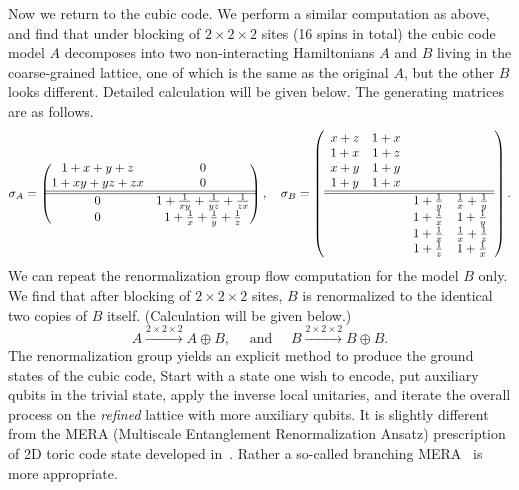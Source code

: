 Now we return to the cubic code. We perform a similar computation as above,
and find that under blocking of $2 \times 2 \times 2$ sites (16 spins in total)
the cubic code model $A$ decomposes into two non-interacting Hamiltonians $A$ and $B$
living in the coarse-grained lattice,
one of which is the same as the original $A$,
but the other $B$ looks different.
Detailed calculation will be given below.
The generating matrices are as follows.
\[
 \sigma_A = 
\begin{pmatrix}
 1+x+y+z & 0 \\
 1+x y+y z+z x & 0 \\
\hline
\hline
 0 & 1+\frac{1}{xy}+\frac{1}{yz}+\frac{1}{zx} \\
 0 & 1+\frac{1}{x}+\frac{1}{y}+\frac{1}{z} \\
\end{pmatrix}, \quad
 \sigma_B = 
\left(
 \begin{array}{cccc}
 x+z & 1+x &   &   \\
 1+x & 1+z &   &   \\
 x+y & 1+y &   &   \\
 1+y & 1+x &   &   \\
\hline
\hline
   &   & 1+\frac{1}{y} & \frac{1}{x}+\frac{1}{y} \\
   &   & 1+\frac{1}{x} & 1+\frac{1}{y} \\
   &   & 1+\frac{1}{x} & \frac{1}{x}+\frac{1}{z} \\
   &   & 1+\frac{1}{z} & 1+\frac{1}{x}
\end{array}
\right).
\]
We can repeat the renormalization group flow computation for the model $B$ only.
We find that after blocking of $2 \times 2 \times 2$ sites,
$B$ is renormalized to the identical two copies of $B$ itself.
(Calculation will be given below.)
\[
 A \xrightarrow{2\times 2 \times 2} A \oplus B, \quad \text{ and } \quad
B \xrightarrow{2 \times 2 \times 2} B \oplus B.
\]
The renormalization group yields an explicit method to produce the ground states of the cubic code,
Start with a state one wish to encode, put auxiliary qubits in the trivial state,
apply the inverse local unitaries, and iterate the overall process on the \emph{refined} lattice with more auxiliary qubits.
It is slightly different from the MERA (Multiscale Entanglement Renormalization Ansatz)
prescription of 2D toric code state developed 
in~\cite{AguadoVidal2007Entanglement}.
Rather a so-called branching MERA~\cite{EvenblyVidal2012class} is more appropriate.

